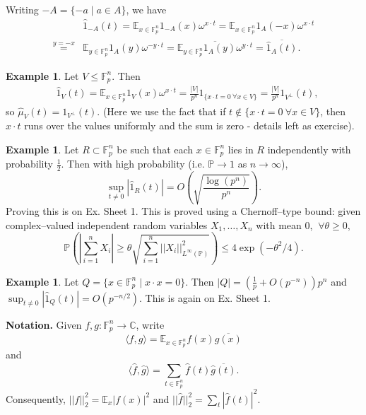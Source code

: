 \documentclass{article}
\theoremstyle{definition}
\newtheorem{example}[theorem]{Example}
\begin{document}
Writing $-A = \{-a \mid a \in A\}$, we have 
\begin{align*}
    &\hat{1}_{-A}(t) = \mathbb{E}_{x \in \mathbb{F}_{p}^n} 1_{-A}(x) \omega^{x\cdot t} = \mathbb{E}_{x \in \mathbb{F}_{p}^n} 1_A(-x)\omega^{x \cdot t} \\
    \stackrel{y=-x}{=}&  \mathbb{E}_{y \in \mathbb{F}_{p}^n} 1_A(y) \omega^{-y \cdot t} = \overline{\mathbb{E}_{y \in \mathbb{F}_{p}^n}1_A(y)\omega^{y \cdot t}} = \overline{\hat{1}_A(t)}.
\end{align*}
\begin{example}\label{ex1.2}
    Let $V \le \mathbb{F}_{p}^n$. Then 
    \begin{align*}
        &\hat{1}_V(t) = \mathbb{E}_{x \in \mathbb{F}_{p}^n}1_V(x)\omega^{x\cdot t} = \frac{|V|}{p^n} 1_{\{x\cdot t = 0 ~\forall x \in V\}} = \frac{|V|}{p^n}1_{V^{\perp}}(t),
    \end{align*}
    so $\hat{\mu}_V(t) = 1_{V^{\perp}}(t)$.
    (Here we use the fact that if $t \not\in \{x \cdot t = 0 ~\forall x \in V\}$, then $x\cdot t$ runs over the values uniformly and the sum is zero - details left as exercise).
\end{example}
\begin{example}
    Let $R \subset \mathbb{F}_{p}^n$ be such that each $x \in \mathbb{F}_{p}^n$ lies in $R$ independently with probability $\frac{1}{2}$. Then with high probability (i.e. $\mathbb{P} \to 1$ as $n \to \infty$),
    \[
    \sup_{t \neq 0} |\hat{1}_R(t)| = O\left(\sqrt{\frac{\log (p^n)}{p^n}}\right).
    \]
    Proving this is on Ex. Sheet 1. This is proved using a Chernoff--type bound: given complex--valued independent random variables $X_1,\ldots,X_n$ with mean 0, $~\forall \theta \ge 0$, 
    \[
    \mathbb{P}\left(\left|\sum_{i=1}^{n} X_i\right| \ge \theta \sqrt{\sum_{i=1}^{n} ||X_i||^2_{L^\infty(\mathbb{P})}}\right) \le 4\exp \left(-\theta^2/4\right).
    \]
\end{example}
\begin{example}
    Let $Q = \{x \in \mathbb{F}_{p}^n \mid x \cdot x = 0\}$. Then $|Q| = \left(\frac{1}{p} + O(p^{-n}) \right)p^n$ and $\sup_{t \neq 0}|\hat{1}_Q(t)| = O(p^{-n/2})$. This is again on Ex. Sheet 1.
\end{example}
\textbf{Notation.} Given $f,g : \mathbb{F}_{p}^n \to \mathbb{C}$, write \[
\langle f,g \rangle = \mathbb{E}_{x \in \mathbb{F}_{p}^n}f(x)\overline{g(x)}
\]
and \[
\langle \hat{f},\hat{g}\rangle = \sum_{t \in \mathbb{F}_{p}^n}^{} \hat{f}(t)\overline{\hat{g}(t)}.
\]
Consequently, $||f||_2^2 = \mathbb{E}_x |f(x)|^2$ and $||\hat{f}||_2^2 = \sum_{t}^{} |\hat{f}(t)|^2$.
\end{document}
